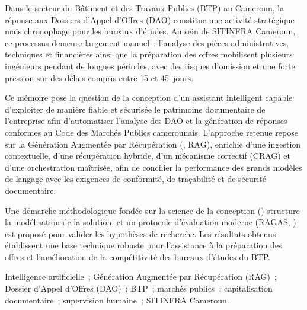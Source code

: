 
Dans le secteur du Bâtiment et des Travaux Publics (BTP) au Cameroun, la
réponse aux Dossiers d'Appel d'Offres (DAO) constitue une activité stratégique
mais chronophage pour les bureaux d'études. Au sein de SITINFRA Cameroun, ce
processus demeure largement manuel~: l'analyse des pièces administratives,
techniques et financières ainsi que la préparation des offres mobilisent
plusieurs ingénieurs pendant de longues périodes, avec des risques d'omission
et une forte pression sur des délais compris entre 15 et 45~jours.

Ce mémoire pose la question de la conception d'un assistant intelligent capable
d'exploiter de manière fiable et sécurisée le patrimoine documentaire de
l'entreprise afin d'automatiser l'analyse des DAO et la génération de réponses
conformes au Code des Marchés Publics camerounais. L'approche retenue repose
sur la Génération Augmentée par Récupération (, RAG), enrichie d'une ingestion contextuelle, d'une récupération
hybride, d'un mécanisme correctif (CRAG) et d'une orchestration maîtrisée, afin
de concilier la performance des grands modèles de langage avec les exigences de
conformité, de traçabilité et de sécurité documentaire.

Une démarche méthodologique fondée sur la science de la conception
() structure la modélisation de la solution, et
un protocole d'évaluation moderne (RAGAS, ) est proposé
pour valider les hypothèses de recherche. Les résultats obtenus établissent une
base technique robuste pour l'assistance à la préparation des offres et
l'amélioration de la compétitivité des bureaux d'études du BTP.

\vspace{0.6em}
\begin{btpbox}
Intelligence artificielle~; Génération Augmentée par Récupération (RAG)~;
Dossier d'Appel d'Offres (DAO)~; BTP~; marchés publics~; capitalisation
documentaire~; supervision humaine~; SITINFRA Cameroun.
\end{btpbox}

\btpEndMark
\clearpage


